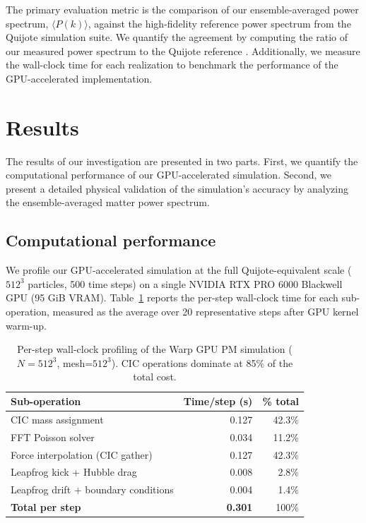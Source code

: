 \documentclass[]{article}
\begin{document}
The primary evaluation metric is the comparison of our ensemble-averaged power spectrum, $\langle P(k) \rangle$, against the high-fidelity reference power spectrum from the Quijote simulation suite. We quantify the agreement by computing the ratio of our measured power spectrum to the Quijote reference \citep{VillaescusaNavarro2020}. Additionally, we measure the wall-clock time for each realization to benchmark the performance of the GPU-accelerated implementation.

\section{Results}
\label{sec:results}
The results of our investigation are presented in two parts. First, we quantify the computational performance of our GPU-accelerated simulation. Second, we present a detailed physical validation of the simulation's accuracy by analyzing the ensemble-averaged matter power spectrum.

\subsection{Computational performance}

We profile our GPU-accelerated simulation at the full Quijote-equivalent scale ($512^3$ particles, 500 time steps) on a single NVIDIA RTX PRO 6000 Blackwell GPU (95 GiB VRAM). Table~\ref{tab:profiling} reports the per-step wall-clock time for each sub-operation, measured as the average over 20 representative steps after GPU kernel warm-up.

\begin{table}[h]
\centering
\caption{Per-step wall-clock profiling of the Warp GPU PM simulation ($N=512^3$, mesh=$512^3$). CIC operations dominate at 85\% of the total cost.}
\label{tab:profiling}
\begin{tabular}{lrr}
\hline
Sub-operation & Time/step (s) & \% total \\
\hline
CIC mass assignment & 0.127 & 42.3\% \\
FFT Poisson solver & 0.034 & 11.2\% \\
Force interpolation (CIC gather) & 0.127 & 42.3\% \\
Leapfrog kick + Hubble drag & 0.008 & 2.8\% \\
Leapfrog drift + boundary conditions & 0.004 & 1.4\% \\
\hline
\textbf{Total per step} & \textbf{0.301} & 100\% \\
\hline
\end{tabular}
\end{table}
\end{document}
